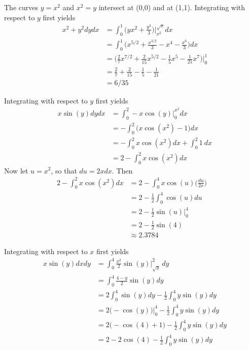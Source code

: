 \documentclass{article}
\begin{document}
\item %
The curves $y=x^2$ and $x^2=y$ intersect at (0,0) and at (1,1). Integrating with respect to $y$ first yields
\begin{align*} 
  \mathop{\int_0^1 \!\!\! \int_{x^2}^{\sqrt{x}}} x^2+y^2 dydx 
  &= \int_0^1 \Big(yx^2 + \frac{y^3}{3} \Big)\Big|_{x^2}^{\sqrt{x}} dx \\
  &= \int_0^1 \Big(x^{5/2} + \frac{x^{3/2}}{3} - x^4 - \frac{x^6}{3}\Big) dx \\
  &= \Big( \frac{2}{7} x^{7/2} + \frac{2}{15}x^{5/2} - \frac{1}{5}x^5 - \frac{1}{21}x^7\Big)\Big|_0^1 \\
  &= \frac{2}{7} + \frac{2}{15} - \frac{1}{5} - \frac{1}{21} \\
  &= 6/35
\end{align*}
\item %
\BEN 
\item Integrating with respect to $y$ first yields
\begin{align*} 
  \mathop{\int_0^2 \!\!\! \int_0^{x^2}} x\sin (y) dydx 
  &= \int_0^2 -x\cos(y)\Big|_0^{x^2} dx \\
  &= - \int_0^2 \Big(x\cos(x^2)-1\Big) dx \\
  &= - \int_0^2x\cos(x^2) dx +  \int_0^2 1 \ dx \\    
  &= 2 - \int_0^2x\cos(x^2) dx 
\end{align*}
Now let $u=x^2$, so that $du = 2xdx$. Then 
\begin{align*} 
  2 - \int_0^2x\cos(x^2) dx  
  &=  2 - \int_0^4 x\cos(u)\Big(\frac{du}{2x}\Big)\\
  &=  2 - \frac{1}{2} \int_0^4 \cos(u)du \\
  &=  2 - \frac{1}{2} \sin(u) \Big|_0^4 \\
  &=  2 - \frac{1}{2} \sin(4) \\
  &\approx 2.3784
\end{align*}
\item Integrating with respect to $x$ first yields
\begin{align*} 
  \mathop{\int_0^4 \!\!\! \int_{\sqrt{y}}^{2} } x\sin (y) dxdy
  &= \int_0^4 \frac{x^2}{2}\sin(y)\Big|_{\sqrt{y}}^{2} \ dy \\
  &= \int_0^4 \frac{4-y}{2}\sin(y) dy \\
  &= 2 \int_0^4 \sin(y) dy - \frac{1}{2} \int_0^4 y\sin(y) dy \\
  &= 2 \big( - \cos(y) \big)\big|_0^4 - \frac{1}{2} \int_0^4 y\sin(y) dy \\
  &= 2 \big( - \cos(4) + 1 \big) - \frac{1}{2} \int_0^4 y\sin(y) dy \\
  &= 2  - 2\cos(4)  - \frac{1}{2} \int_0^4 y\sin(y) dy \\
\end{align*}
\end{document}
